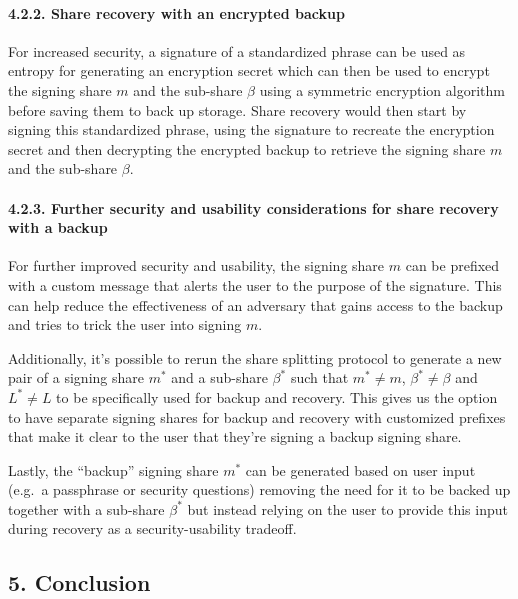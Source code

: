 \documentclass[
]{article}
\begin{document}
\hypertarget{share-recovery-backup-encrypted}{%
\paragraph{4.2.2. Share recovery with an encrypted
backup}\label{share-recovery-backup-encrypted}}

For increased security, a signature of a standardized phrase can be used
as entropy for generating an encryption secret which can then be used to
encrypt the signing share \(m\) and the sub-share \(\beta\) using a
symmetric encryption algorithm before saving them to back up storage.
Share recovery would then start by signing this standardized phrase,
using the signature to recreate the encryption secret and then
decrypting the encrypted backup to retrieve the signing share \(m\) and
the sub-share \(\beta\).

\hypertarget{share-recovery-backup-enhancements}{%
\paragraph{4.2.3. Further security and usability considerations for
share recovery with a backup}\label{share-recovery-backup-enhancements}}

For further improved security and usability, the signing share \(m\) can
be prefixed with a custom message that alerts the user to the purpose of
the signature. This can help reduce the effectiveness of an adversary
that gains access to the backup and tries to trick the user into signing
\(m\).

Additionally, it's possible to rerun the share splitting protocol to
generate a new pair of a signing share \(m^ \ast\) and a sub-share
\(\beta ^ \ast\) such that \(m^ \ast \neq m\),
\(\beta ^ \ast \neq \beta\) and \(L^ \ast \neq L\) to be specifically
used for backup and recovery. This gives us the option to have separate
signing shares for backup and recovery with customized prefixes that
make it clear to the user that they're signing a backup signing share.

Lastly, the ``backup'' signing share \(m^ \ast\) can be generated based
on user input (e.g.~a passphrase or security questions) removing the
need for it to be backed up together with a sub-share \(\beta ^ \ast\)
but instead relying on the user to provide this input during recovery as
a security-usability tradeoff.

\hypertarget{conclusion}{%
\subsection{5. Conclusion}\label{conclusion}}
\end{document}
